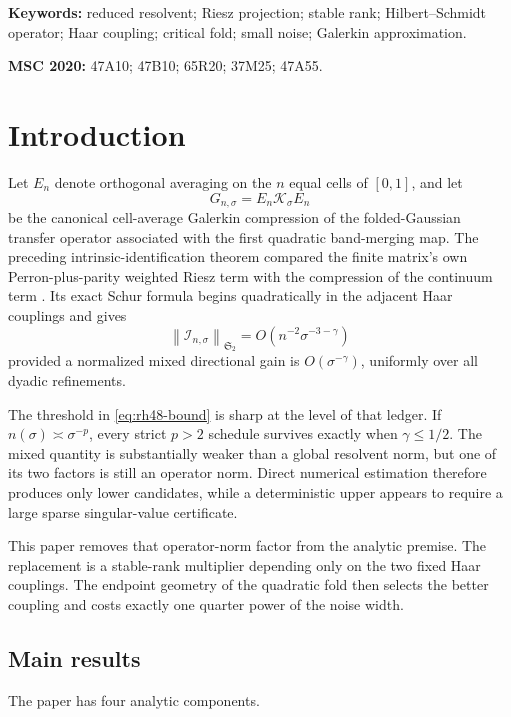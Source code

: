 \documentclass[11pt]{article}
\theoremstyle{definition}
\theoremstyle{remark}
\newcommand{\cK}{\mathcal K}
\newcommand{\cI}{\mathcal I}
\newcommand{\HS}{\mathfrak S_2}
\newcommand{\norm}[1]{\left\lVert #1\right\rVert}
\begin{document}
\noindent\textbf{Keywords:} reduced resolvent; Riesz projection; stable
rank; Hilbert--Schmidt operator; Haar coupling; critical fold; small noise;
Galerkin approximation.

\medskip
\noindent\textbf{MSC 2020:} 47A10; 47B10; 65R20; 37M25; 47A55.

\section{Introduction}
\label{sec:introduction}

Let \(E_n\) denote orthogonal averaging on the \(n\) equal cells of
\([0,1]\), and let
\[
 G_{n,\sigma}=E_n\cK_\sigma E_n
\]
be the canonical cell-average Galerkin compression of the folded-Gaussian
transfer operator associated with the first quadratic band-merging map.  The
preceding intrinsic-identification theorem compared the finite matrix's own
Perron-plus-parity weighted Riesz term with the compression of the continuum
term \citep{WangIntrinsic2026}.  Its exact Schur formula begins quadratically
in the adjacent Haar couplings and gives
\begin{equation}
 \norm{\cI_{n,\sigma}}_{\HS}
 =O(n^{-2}\sigma^{-3-\gamma})
 \label{eq:rh48-bound}
\end{equation}
provided a normalized mixed directional gain is
\(O(\sigma^{-\gamma})\), uniformly over all dyadic refinements.

The threshold in \eqref{eq:rh48-bound} is sharp at the level of that
ledger.  If \(n(\sigma)\asymp\sigma^{-p}\), every strict \(p>2\) schedule
survives exactly when \(\gamma\le1/2\).  The mixed quantity is substantially
weaker than a global resolvent norm, but one of its two factors is still an
operator norm.  Direct numerical estimation therefore produces only lower
candidates, while a deterministic upper appears to require a large sparse
singular-value certificate.

This paper removes that operator-norm factor from the analytic premise.  The
replacement is a stable-rank multiplier depending only on the two fixed Haar
couplings.  The endpoint geometry of the quadratic fold then selects the
better coupling and costs exactly one quarter power of the noise width.

\subsection*{Main results}

The paper has four analytic components.
\end{document}
